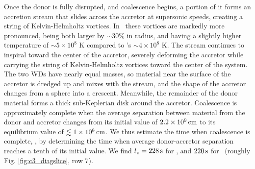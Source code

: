 
Once the donor is fully disrupted, and coalescence begins, a portion of it forms an accretion stream that slides across the accretor at supersonic speeds, creating a string of Kelvin-Helmholtz vortices.  In \arepo\ these vortices are markedly more pronounced, being both larger by $\sim30$\% in radius, and having a slightly higher temperature of $\sim5\times10^8$ K compared to \gasoline's $\sim4\times10^8$ K.  The stream continues to inspiral toward the center of the accretor, severely deforming the accretor while carrying the string of Kelvin-Helmholtz vortices toward the center of the system.  The two WDs have nearly equal masses, so material near the surface of the accretor is dredged up and mixes with the stream, and the shape of the accretor changes from a sphere into a crescent.  Meanwhile, the remainder of the donor material forms a thick sub-Keplerian disk around the accretor.  Coalescence is approximately complete when the average separation between material from the donor and accretor changes from its initial value of $2.2\times10^9\,\mathrm{cm}$ to its equilibrium value of $\lesssim1\times10^8\,\mathrm{cm}$.  We thus estimate the time when coalescence is complete, \tcoal, by determining the time when average donor-accretor separation reaches a tenth of its initial value.  We find $\tcoal = 228\,\mrm{s}$ for \gasoline, and $220\,\mathrm{s}$ for \arepo\ (roughly Fig. \ref{fig:c3_diagslice}, row $7$).

